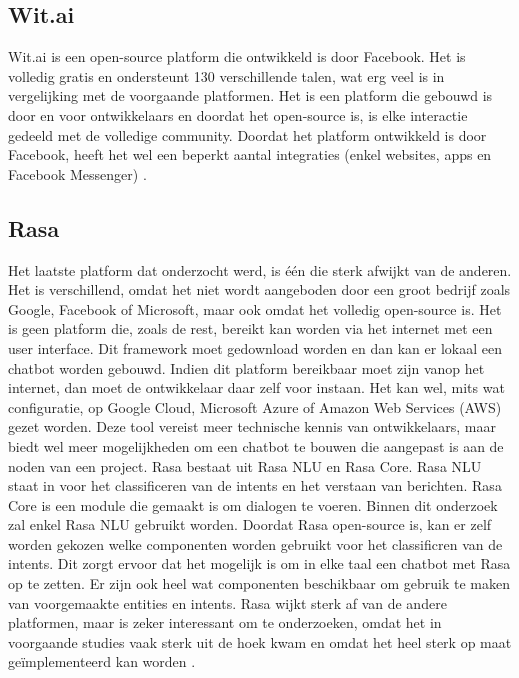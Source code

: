 \subsection{Wit.ai}
\label{subsec:nlp-platformen-wit.ai}

Wit.ai is een open-source platform die ontwikkeld is door Facebook. Het is volledig gratis en ondersteunt 130 verschillende talen, wat erg veel is in vergelijking met de voorgaande platformen. Het is een platform die gebouwd is door en voor ontwikkelaars en doordat het open-source is, is elke interactie gedeeld met de volledige community. Doordat het platform ontwikkeld is door Facebook, heeft het wel een beperkt aantal integraties (enkel websites, apps en Facebook Messenger) \autocite{Wit2020}.

\subsection{Rasa}
\label{subsec:nlp-platformen-rasa}

Het laatste platform dat onderzocht werd, is één die sterk afwijkt van de anderen. Het is verschillend, omdat het niet wordt aangeboden door een groot bedrijf zoals Google, Facebook of Microsoft, maar ook omdat het volledig open-source is. Het is geen platform die, zoals de rest, bereikt kan worden via het internet met een user interface. Dit framework moet gedownload worden en dan kan er lokaal een chatbot worden gebouwd. Indien dit platform bereikbaar moet zijn vanop het internet, dan moet de ontwikkelaar daar zelf voor instaan. Het kan wel, mits wat configuratie, op Google Cloud, Microsoft Azure of Amazon Web Services (AWS) gezet worden. Deze tool vereist meer technische kennis van ontwikkelaars, maar biedt wel meer mogelijkheden om een chatbot te bouwen die aangepast is aan de noden van een project. Rasa bestaat uit Rasa NLU en Rasa Core.  Rasa NLU staat in voor het classificeren van de intents en het verstaan van berichten. Rasa Core is een module die gemaakt is om dialogen te voeren. Binnen dit onderzoek zal enkel Rasa NLU gebruikt worden. Doordat Rasa open-source is, kan er zelf worden gekozen welke componenten worden gebruikt voor het classificren van de intents. Dit zorgt ervoor dat het mogelijk is om in elke taal een chatbot met Rasa op te zetten. Er zijn ook heel wat componenten beschikbaar om gebruik te maken van voorgemaakte entities en intents. Rasa wijkt sterk af van de andere platformen, maar is zeker interessant om te onderzoeken, omdat het in voorgaande studies vaak sterk uit de hoek kwam en omdat het heel sterk op maat geïmplementeerd kan worden \autocite{RASA2020}.

